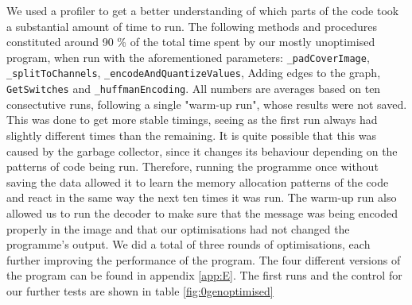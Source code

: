 We used a profiler to get a better understanding of which parts of the code took a substantial amount of time to run.
The following methods and procedures constituted around 90 \% of the total time spent by our mostly unoptimised program, when run with the aforementioned parameters:
\lstinline|_padCoverImage|, \lstinline|_splitToChannels|, \lstinline|_encodeAndQuantizeValues|, Adding edges to the graph, \lstinline|GetSwitches| and \lstinline|_huffmanEncoding|.
All numbers are averages based on ten consectutive runs, following a single "warm-up run", whose results were not saved.
This was done to get more stable timings, seeing as the first run always had slightly different times than the remaining.
It is quite possible that this was caused by the garbage collector, since it changes its behaviour depending on the patterns of code being run.
Therefore, running the programme once without saving the data allowed it to learn the memory allocation patterns of the code and react in the same way the next ten times it was run.
The warm-up run also allowed us to run the decoder to make sure that the message was being encoded properly in the image and that our optimisations had not changed the programme's output.
We did a total of three rounds of optimisations, each further improving the performance of the program.
The four different versions of the program can be found in appendix \ref{app:E}.
The first runs and the control for our further tests are shown in table \ref{fig:0genoptimised}

